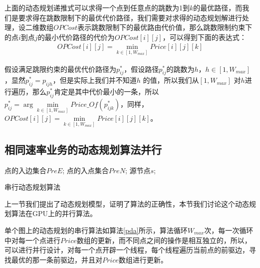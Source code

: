 上面的动态规划递推式可以求得一个点到任意点的跳数为1到$k$的最优路径，而我们是要求得在跳数限制下的最优代价路径，我们需要对求得的动态规划解进行处理，设二维数组$OPCost$表示跳数限制下的最优路由代价值，那么跳数限制约束下的点$i$到点$j$的最小代价路径的代价为$OPCost[i][j]$，可以得到下面的表达式：
\begin{equation}\label{best}
\begin{split}
OPCost[i][j]=\min\limits_{k \in [1,W_{max}]}{Price[i][j][k]}
\end{split}
\end{equation}

假设满足跳限约束的最优代价路径为$p_{ij}^*$，假设路径$p_{ij}^*$的跳数为$h$，$h \in [1,W_{max}]$，显然$p_{ij}^*=p_{ijh}$，但是实际上我们并不知道$h$ 的值，所以我们从$[1,W_{max}]$ 对$h$进行遍历，那么$p_{ij}^*$肯定是其中代价最小的一条，所以$p_{ij}^*=\arg\min\limits_{k \in [1,W_{max}]}{Price\_Of(p_{ijk}^*)}$，同样，$OPCost[i][j]=\min\limits_{k \in [1,W_{max}]}{Price[i][j][k]}$。

\subsection{相同速率业务的动态规划算法并行}

\begin{algorithm}[t]
\begin{algorithmic}[1]
\Require
点的入边集合$PreE$;
点的入点集合$PreN$;
源节点$s$;
\EndFor
\EndFor
\end{algorithmic}
\caption{{串行动态规划算法}}
\label{pda}
\end{algorithm}

上一节我们提出了动态规划模型，证明了算法的正确性，本节我们讨论这个动态规划算法在GPU上的并行算法。

单个图上的动态规划的串行算法如算法\ref{pda}所示，算法循环$W_{max}$次，每一次循环中对每一个点进行$Price$数组的更新，而不同点之间的操作是相互独立的，所以，可以进行并行设计，对每一个点开辟一个线程，每个线程遍历当前点的前驱边，寻找最优的那一条前驱边，并且对$Price$数组进行更新。

